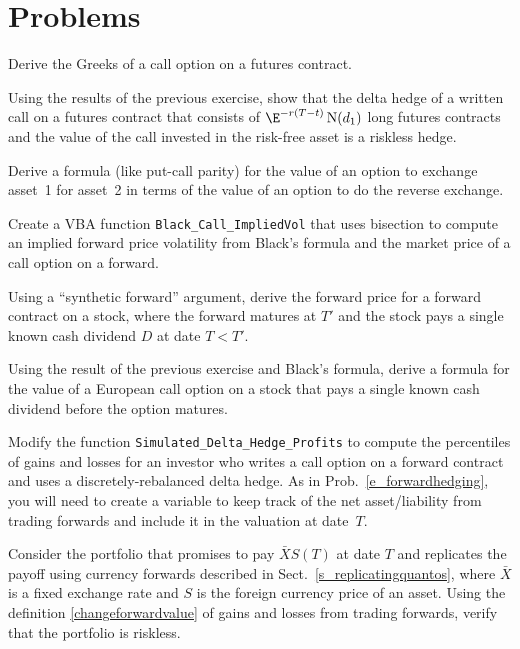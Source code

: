 \section*{Problems}
\begin{prob} Derive the Greeks of a call option on a futures contract.
\end{prob}\begin{prob} Using the results of the previous exercise, show that the delta hedge of a written call on a futures contract that consists of $\E^{-r(T-t)}\N(d_1)$ long futures contracts and the value of the call invested in the risk-free asset is a riskless hedge.
\end{prob}\begin{prob} Derive a formula (like put-call parity) for the value of an option to exchange asset~1 for asset~2 in terms of the value of an option to do the reverse exchange.
\end{prob}\begin{prob} Create a VBA function \verb!Black_Call_ImpliedVol! that uses bisection to compute an implied forward price volatility from Black's formula and the market price of a call option on a forward.
\end{prob}\begin{prob} Using a ``synthetic forward'' argument, derive the forward price for a forward contract on a stock, where the forward matures at $T'$ and the stock pays a single known cash dividend $D$ at date $T<T'$.
\end{prob}\begin{prob} Using the result of the previous exercise and Black's formula, derive a formula for the value of a European call option on a stock that pays a single known cash dividend before the option matures.
\end{prob}\begin{prob} Modify the function \verb!Simulated_Delta_Hedge_Profits! to compute the percentiles of gains and losses for an investor who writes a call option on a forward contract and uses a discretely-rebalanced delta hedge.  As in Prob.~\ref{e_forwardhedging}, you will need to create a variable to keep track of the net asset/liability from trading forwards and include it in the valuation at date~$T$.
\end{prob}\begin{prob} Consider the portfolio that promises to pay $\bar{X}S(T)$ at date $T$ and replicates the payoff using currency forwards described in Sect.~\ref{s_replicatingquantos}, where $\bar{X}$ is a fixed exchange rate and $S$ is the foreign currency price of an asset.  Using the definition \eqref{changeforwardvalue} of gains and losses from trading forwards, verify that the portfolio is riskless.

\end{prob}
